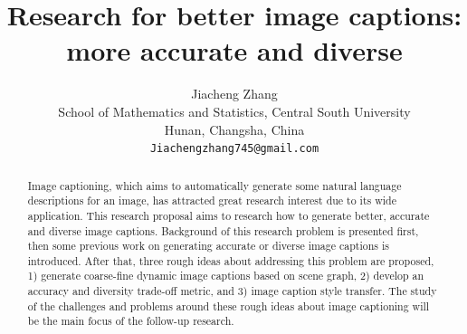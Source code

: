 \documentclass[12pt]{article}
\begin{document}
	
	\title{Research for better image captions:\\
		more accurate and diverse
	}

	\author{Jiacheng Zhang \\
	School of Mathematics and Statistics, Central South University\\
	Hunan, Changsha, China\\
	{\tt\small Jiachengzhang745@gmail.com}
	}
	
	\date{}
	
	\maketitle

	\begin{abstract}
	Image captioning, which aims to automatically generate some natural language descriptions for an image, has attracted great research interest due to its wide application. This research proposal aims to research how to generate better, accurate and diverse image captions. Background of this research problem is presented first, then some previous work on generating accurate or diverse image captions is introduced. After that, three rough ideas about addressing this problem are proposed, 1) generate coarse-fine dynamic image captions based on scene graph, 2) develop an accuracy and diversity trade-off metric, and 3) image caption style transfer. The study of the challenges and problems around these rough ideas about image captioning will be the main focus of the follow-up research.
	\end{abstract}
\end{document}
